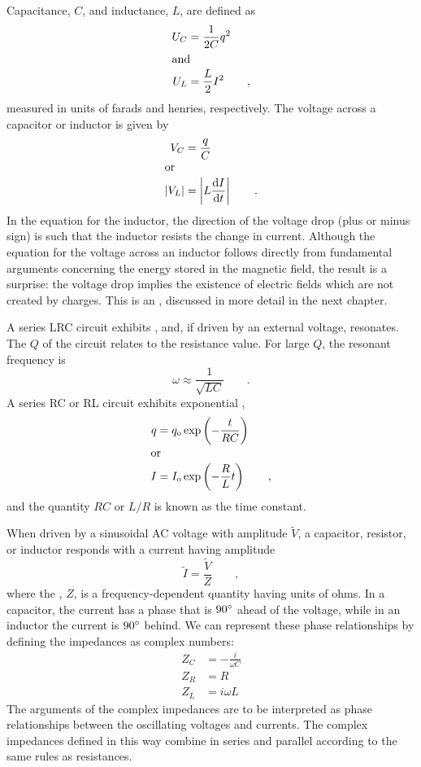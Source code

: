 	Capacitance, $C$, and inductance, $L$, are defined as
	\begin{align*}
		U_C    &=   \frac{1}{2C}q^2    \\
	\intertext{and}
		U_L    &=    \frac{L}{2}I^2   \qquad   ,
	\end{align*}
	measured in units of farads and henries, respectively.
	The voltage across a capacitor or inductor is given by
	\begin{align*}
		V_C	&= \frac{q}{C} \\
	\intertext{or}
		|V_L|	&= \left|L\frac{\operatorname{d\!} I}{\operatorname{d\!} t}\right| \qquad .
	\end{align*}
	In the equation for the inductor, the
	direction of the voltage drop (plus or minus sign) is such
	that the inductor resists the change in current.
	Although the equation for the voltage across an inductor follows
	directly from fundamental arguments concerning the energy
	stored in the magnetic field, the result is a surprise: the
	voltage drop implies the existence of electric fields which
	are not created by charges. This is an ,
	discussed in more detail in the next chapter.
	
	A series LRC circuit exhibits , and, if driven
	by an external voltage, resonates.
	The $Q$ of the circuit relates to the resistance value. For large
	$Q$, the resonant frequency is
	\begin{equation*}
	  \omega \approx \frac{1}{\sqrt{LC}} \qquad   .
	\end{equation*}
	A series RC or RL circuit exhibits exponential ,
	\begin{align*}
		q &= q_{\textup{o}}\exp\left(-\frac{t}{RC}\right) \\
	\intertext{or}
		I &= I_{\textup{o}}\exp\left(-\frac{R}{L}t\right) \qquad ,
	\end{align*}
	and the quantity $RC$ or $L/R$ is known as the time constant.

	When driven by a sinusoidal AC voltage with amplitude $\tilde{V}$,
	a capacitor, resistor, or inductor responds with a current
	having amplitude
	\begin{equation*}
		\tilde{I} = \frac{\tilde{V}}{Z} \qquad ,
	\end{equation*}
	where the , $Z$, is a frequency-dependent quantity
	having units of ohms.
	In a capacitor, the current has a phase that is $90\mspace{0mu}^\circ$ ahead of the voltage,
	while in an inductor the current is $90\mspace{0mu}^\circ$ behind.
        We can represent these phase relationships by defining the impedances
	 as complex numbers:
	 \begin{align*}
		Z_C &= -\frac{i}{\omega C}\\
		Z_R	&= R\\
		Z_L &= i\omega L 
	\end{align*}
	The arguments of the complex impedances are to be interpreted as phase relationships between the
	oscillating voltages and currents.
	The complex impedances defined in this way combine in series and parallel
	 according to the same rules as resistances.

